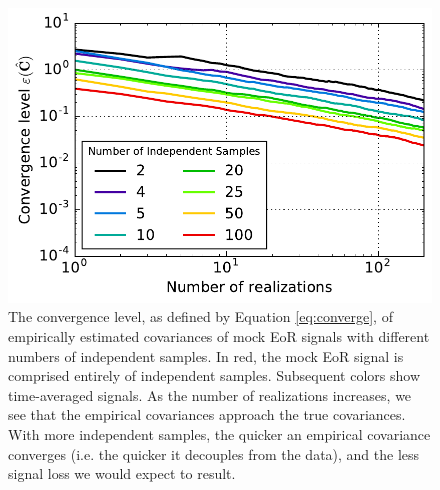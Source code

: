 \documentclass[preprint2,numberedappendix,tighten]{aastex6}  %
\begin{document}
\begin{figure}
	\centering
	\includegraphics[width=\columnwidth]{plots/toy_sigloss16.pdf}
	\caption{The convergence level, as defined by Equation \eqref{eq:converge}, of empirically estimated covariances of mock EoR signals with different numbers of independent samples. In red, the mock EoR signal is comprised entirely of independent samples. Subsequent colors show time-averaged signals. As the number of realizations increases, we see that the empirical covariances approach the true covariances. With more independent samples, the quicker an empirical covariance converges (i.e. the quicker it decouples from the data), and the less signal loss we would expect to result.}
	\label{fig:toy_sigloss16}
\end{figure}
\end{document}
